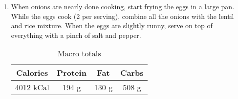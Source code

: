 \documentclass{report}
\begin{document}
\begin{multicols}{2}
\begin{enumerate}
\item When onions are nearly done cooking, start frying the eggs in a large pan. While the eggs cook (2 per serving), combine all the onions with the lentil and rice mixture. When the eggs are slightly runny, serve on top of everything with a pinch of salt and pepper. 

 



\begin{table}[H]
  \begin{center}
    \caption{Macro totals}
    \label{tab:table1}
    \begin{tabular}{c|c|c|c} %
      \textbf{Calories} & \textbf{Protein} & \textbf{Fat} & \textbf{Carbs}\\
      \hline
      4012 kCal & 194 g & 130 g & 508 g\\
    \end{tabular}
  \end{center}
\end{table}
 
\end{enumerate}
\end{multicols}




\end{document}
